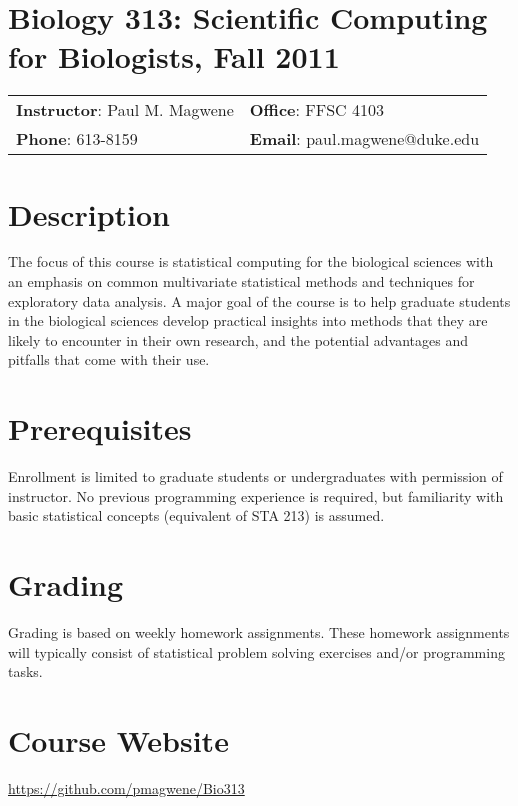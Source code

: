 \documentclass[11pt,letterpaper]{article}
\begin{document}
\section*{\centering Biology 313: Scientific Computing for Biologists, Fall 2011}
\begin{center}
\begin{tabular}{ll}
\textbf{Instructor}: Paul M. Magwene & \textbf{Office}: FFSC 4103\\
\textbf{Phone}: 613-8159 & \textbf{Email}: paul.magwene@duke.edu
\end{tabular}
\end{center}

\section*{Description}

The focus of this course is statistical computing for the biological sciences with an emphasis on common multivariate statistical methods and techniques for exploratory data analysis. A major goal of the course is to help graduate students in the biological sciences develop practical insights into methods that they are likely to encounter in their own research, and the potential advantages and pitfalls that come with their use. 

\section*{Prerequisites}

Enrollment is limited to graduate students or undergraduates with permission of instructor. No previous programming experience is required, but familiarity with basic statistical concepts (equivalent of STA 213) is assumed. 

\section*{Grading}
Grading is based on weekly homework assignments. These homework assignments will typically consist of statistical problem solving exercises and/or programming tasks.

\section*{Course Website}

\href{https://github.com/pmagwene/Bio313}{https://github.com/pmagwene/Bio313}
\end{document}

